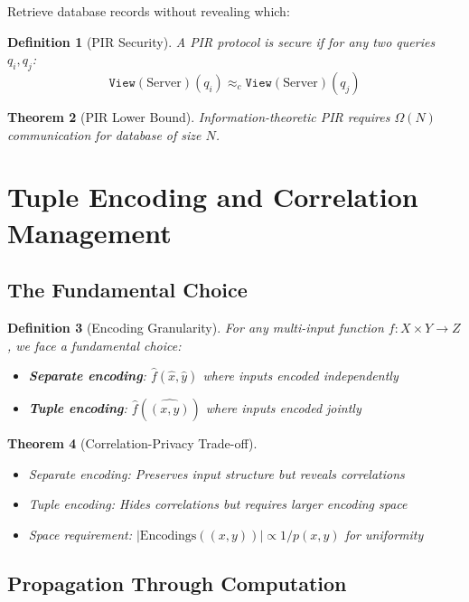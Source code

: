 \documentclass[11pt,final]{article}
\newtheorem{theorem}{Theorem}[section]
\newtheorem{definition}[theorem]{Definition}
\newcommand{\View}[1]{\mathtt{View}(#1)}
\begin{document}
Retrieve database records without revealing which:

\begin{definition}[PIR Security]
A PIR protocol is secure if for any two queries $q_i, q_j$:
\begin{equation}
\View{\text{Server}}(q_i) \approx_c \View{\text{Server}}(q_j)
\end{equation}
\end{definition}

\begin{theorem}[PIR Lower Bound]
Information-theoretic PIR requires $\Omega(N)$ communication for database of size $N$.
\end{theorem}

\section{Tuple Encoding and Correlation Management}

\subsection{The Fundamental Choice}

\begin{definition}[Encoding Granularity]
For any multi-input function $f: X \times Y \to Z$, we face a fundamental choice:
\begin{itemize}
    \item \textbf{Separate encoding}: $\hat{f}(\hat{x}, \hat{y})$ where inputs encoded independently
    \item \textbf{Tuple encoding}: $\hat{f}(\widehat{(x,y)})$ where inputs encoded jointly
\end{itemize}
\end{definition}

\begin{theorem}[Correlation-Privacy Trade-off]
\begin{itemize}
    \item Separate encoding: Preserves input structure but reveals correlations
    \item Tuple encoding: Hides correlations but requires larger encoding space
    \item Space requirement: $|\text{Encodings}((x,y))| \propto 1/p(x,y)$ for uniformity
\end{itemize}
\end{theorem}

\subsection{Propagation Through Computation}
\end{document}
